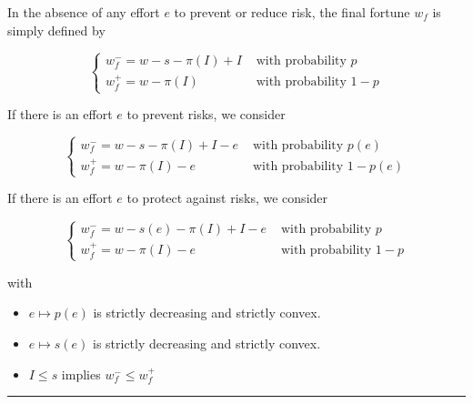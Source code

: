 \begin{f}
 In the absence of any effort $e$ to prevent or reduce risk, the final fortune $w_{f}$ is simply defined by

$$
\begin{cases}w_{f}^{-}=w-s-\pi(I)+I & \text { with probability } p \\ w_{f}^{+}=w-\pi(I) & \text { with probability } 1-p\end{cases}
$$

If there is an effort $e$ to prevent risks, we consider

$$
\begin{cases}w_{f}^{-}=w-s-\pi(I)+I-e & \text { with probability } p(e) \\ w_{f}^{+}=w-\pi(I)-e & \text { with probability } 1-p(e)\end{cases}
$$

If there is an effort $e$ to protect against risks, we consider

$$
\begin{cases}w_{f}^{-}=w-s(e)-\pi(I)+I-e & \text { with probability } p \\ w_{f}^{+}=w-\pi(I)-e & \text { with probability } 1-p\end{cases}
$$

with
\begin{itemize}
	\item $e \mapsto p(e)$ is strictly decreasing and strictly convex.
	\item $e \mapsto s(e)$ is strictly decreasing and strictly convex.\\
	\item $I \leq s$ implies $w_{f}^{-} \leq w_{f}^{+}$
\end{itemize}

\end{f}
\hrule


